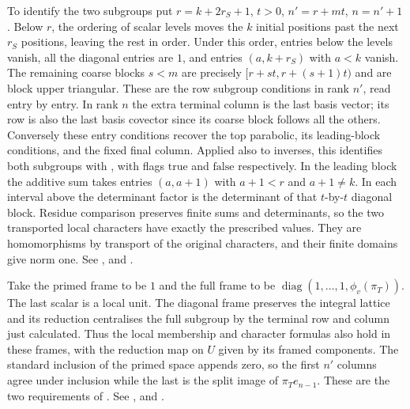 To identify the two subgroups put $r=k+2r_S+1$, $t>0$,
$n'=r+mt$, $n=n'+1$. Below $r$, the ordering of scalar levels moves the
$k$ initial positions past the next $r_S$ positions, leaving the rest
in order. Under this order, entries below the levels vanish, all the
diagonal entries are $1$, and entries $(a,k+r_S)$ with $a<k$ vanish.
The remaining coarse blocks $s<m$ are precisely
$[r+st,r+(s+1)t)$ and are block upper triangular. These are the row
subgroup conditions in rank $n'$, read entry by entry. In rank $n$ the
extra terminal column is the last basis vector; its row is also the
last basis covector since its coarse block follows all the others.
Conversely these entry conditions recover the top parabolic, its
leading-block conditions, and the fixed final column. Applied also to
inverses, this identifies both subgroups with , with flags
$\mathrm{true}$ and $\mathrm{false}$ respectively. In the leading
block the additive sum takes entries $(a,a+1)$ with $a+1<r$ and
$a+1\ne k$. In each interval above the determinant factor is the
determinant of that $t$-by-$t$ diagonal block. Residue comparison
preserves finite sums and determinants, so the two transported local
characters have exactly the prescribed  values. They
are homomorphisms by transport of the original characters, and their
finite domains give norm one. See ,
 and .

Take the primed frame to be $1$ and the full frame to be
$\operatorname{diag}(1,\ldots,1,\phi_v(\pi_T))$. The last scalar
is a local unit. The diagonal frame preserves the integral lattice and
its reduction centralises the full subgroup by the terminal row and
column just calculated. Thus the local membership and character formulas
also hold in these frames, with the reduction map on $U$ given by its
framed components. The standard inclusion of the primed space appends
zero, so the first $n'$ columns agree under inclusion while the last is
the split image of $\pi_T e_{n-1}$. These are the two requirements of
. See ,
 and .

